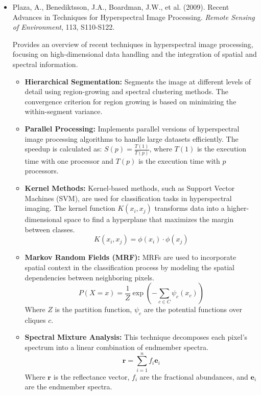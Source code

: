 \documentclass[10pt,svgnames,fragile]{beamer}
\begin{document}
\begin{frame}{}
\tiny
\begin{itemize}

    \item Plaza, A., Benediktsson, J.A., Boardman, J.W., et al. (2009). Recent Advances in Techniques for Hyperspectral Image Processing. \textit{Remote Sensing of Environment}, 113, S110-S122. \href{https://www.sciencedirect.com/science/article/pii/S0034425709000807}{\color{blue}{DOI: 10.1016/j.rse.2009.01.007}}
    \cite{plazaRecentAdvancesTechniques2009}
    
    {\color{gray}Provides an overview of recent techniques in hyperspectral image processing, focusing on high-dimensional data handling and the integration of spatial and spectral information.}
    \begin{itemize} \tiny
    \item \textbf{Hierarchical Segmentation:} Segments the image at different levels of detail using region-growing and spectral clustering methods. The convergence criterion for region growing is based on minimizing the within-segment variance.
    \item \textbf{Parallel Processing:} Implements parallel versions of hyperspectral image processing algorithms to handle large datasets efficiently. The speedup is calculated as: \( S(p) = \frac{T(1)}{T(p)} \), where \( T(1) \) is the execution time with one processor and \( T(p) \) is the execution time with \( p \) processors.
    \item \textbf{Kernel Methods:} Kernel-based methods, such as Support Vector Machines (SVM), are used for classification tasks in hyperspectral imaging. The kernel function \( K(x_i, x_j) \) transforms data into a higher-dimensional space to find a hyperplane that maximizes the margin between classes.
    \[
    K(x_i, x_j) = \phi(x_i) \cdot \phi(x_j)
    \]
    \item \textbf{Markov Random Fields (MRF):} MRFs are used to incorporate spatial context in the classification process by modeling the spatial dependencies between neighboring pixels.
    \[
    P(X = x) = \frac{1}{Z} \exp\left( - \sum_{c \in C} \psi_c(x_c) \right)
    \]
    Where \( Z \) is the partition function, \( \psi_c \) are the potential functions over cliques \( c \).
    \item \textbf{Spectral Mixture Analysis:} This technique decomposes each pixel's spectrum into a linear combination of endmember spectra.
    \[
    \mathbf{r} = \sum_{i=1}^{n} f_i \mathbf{e}_i
    \]
    Where \( \mathbf{r} \) is the reflectance vector, \( f_i \) are the fractional abundances, and \( \mathbf{e}_i \) are the endmember spectra.
\end{itemize}

\end{itemize}
\end{frame}
\end{document}

